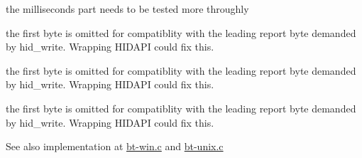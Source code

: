 \begin{DoxyRefList}
\item[\label{bug__bug000003}%
\hypertarget{bug__bug000003}{}%
global\+Scope$>$ Global \hyperlink{bt-unix_8c_a0100d3e3520a9b774896f6b2a2f589f5}{bt\+\_\+read} (void $\ast$fd\+\_\+, u8 $\ast$buf, size\+\_\+t count, int milliseconds)]the milliseconds part needs to be tested more throughly  
\item[\label{bug__bug000004}%
\hypertarget{bug__bug000004}{}%
global\+Scope$>$ Global \hyperlink{bt-win_8c_a4da84bfe7c552c082e73af8f28ff2af5}{bt\+\_\+write} (void $\ast$handle, const u8 $\ast$buf, size\+\_\+t count)]the first byte is omitted for compatiblity with the leading report byte demanded by {\ttfamily hid\+\_\+write}. Wrapping H\+I\+D\+A\+P\+I could fix this.  
\item[\label{bug__bug000002}%
\hypertarget{bug__bug000002}{}%
global\+Scope$>$ Global \hyperlink{bt-unix_8c_acbb62c11a110c097a4a9be010af9c4e7}{bt\+\_\+write} (void $\ast$fd\+\_\+, const u8 $\ast$buf, size\+\_\+t count)]the first byte is omitted for compatiblity with the leading report byte demanded by {\ttfamily hid\+\_\+write}. Wrapping H\+I\+D\+A\+P\+I could fix this.  
\item[\label{bug__bug000007}%
\hypertarget{bug__bug000007}{}%
global\+Scope$>$ Global \hyperlink{btserial_8h_ac9b25cd932b8c5a842d1cd96e22fd200}{bt\+\_\+write} (void $\ast$device, const u8 $\ast$buf, size\+\_\+t count)]the first byte is omitted for compatiblity with the leading report byte demanded by {\ttfamily hid\+\_\+write}. Wrapping H\+I\+D\+A\+P\+I could fix this. \begin{DoxySeeAlso}{See also}
implementation at \hyperlink{bt-win_8c}{bt-\/win.\+c} and \hyperlink{bt-unix_8c}{bt-\/unix.\+c}  
\end{DoxySeeAlso}


\end{DoxyRefList}
